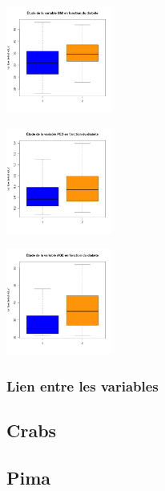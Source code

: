 \documentclass[10pt]{article}
\begin{document}
\begin{center}
\begin{minipage}[t]{0.3\textwidth}
		\end{minipage}
		\begin{minipage}[t]{0.3\textwidth}
			\includegraphics[width=35mm]{Figures/Pima/bxp_z_bmi.png}
		\end{minipage}
		\newline
		\begin{minipage}[t]{0.3\textwidth}
			\includegraphics[width=35mm]{Figures/Pima/bxp_z_ped.png}
		\end{minipage}
		\begin{minipage}[t]{0.3\textwidth}
			\includegraphics[width=35mm]{Figures/Pima/bxp_z_age.png}
		\end{minipage}
	\end{center}
	
	\subsubsection{Lien entre les variables}
	
	
	\subsection{Crabs}
	
	\subsection{Pima}
	
\end{document}

